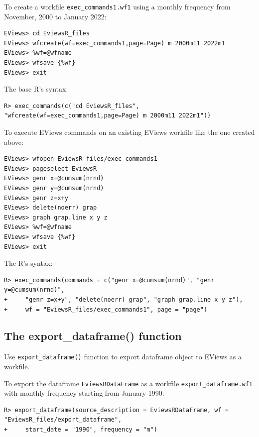 To create a workfile \texttt{exec\_commands1.wf1} using a monthly frequency from November, 2000 to January 2022:

\begin{verbatim}
EViews> cd EviewsR_files
EViews> wfcreate(wf=exec_commands1,page=Page) m 2000m11 2022m1
EViews> %wf=@wfname
EViews> wfsave {%wf}
EViews> exit
\end{verbatim}

The base R's syntax:

\begin{verbatim}
R> exec_commands(c("cd EviewsR_files", "wfcreate(wf=exec_commands1,page=Page) m 2000m11 2022m1"))
\end{verbatim}

To execute EViews commands on an existing EViews workfile like the one created above:

\begin{verbatim}
EViews> wfopen EviewsR_files/exec_commands1
EViews> pageselect EviewsR
EViews> genr x=@cumsum(nrnd)
EViews> genr y=@cumsum(nrnd)
EViews> genr z=x+y
EViews> delete(noerr) grap
EViews> graph grap.line x y z
EViews> %wf=@wfname
EViews> wfsave {%wf}
EViews> exit
\end{verbatim}

The R's syntax:

\begin{verbatim}
R> exec_commands(commands = c("genr x=@cumsum(nrnd)", "genr y=@cumsum(nrnd)",
+     "genr z=x+y", "delete(noerr) grap", "graph grap.line x y z"),
+     wf = "EviewsR_files/exec_commands1", page = "page")
\end{verbatim}

\hypertarget{the-export_dataframe-function}{%
\subsection{The export\_dataframe() function}\label{the-export_dataframe-function}}

Use \texttt{export\_dataframe()} function to export dataframe object to EViews as a workfile.

To export the dataframe \texttt{EviewsRDataFrame} as a workfile \texttt{export\_dataframe.wf1} with monthly frequency starting from January 1990:

\begin{verbatim}
R> export_dataframe(source_description = EviewsRDataFrame, wf = "EviewsR_files/export_dataframe",
+     start_date = "1990", frequency = "m")
\end{verbatim}

